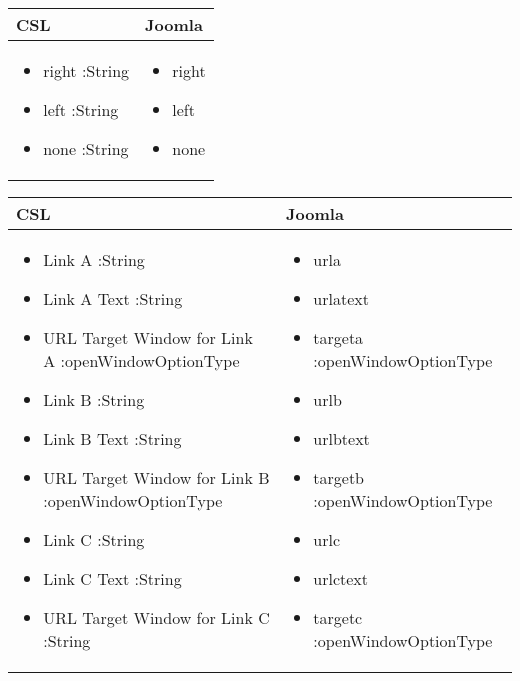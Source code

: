 \begin{minipage}{0.7\textwidth}
\begin{tabular}{|p{} | p{}|}
\hline
\textbf{CSL} & \textbf{Joomla} \\ 
\hline
\begin{itemize}
\item right :String
\item left :String
\item none :String
\end{itemize}
 & 
\begin{itemize}
\item right
\item left
\item none
\end{itemize}
\\
\hline
\end{tabular}
\end{minipage}

\begin{minipage}{0.7\textwidth}
\begin{tabular}{|p{} | p{}|}
\hline
\textbf{CSL} & \textbf{Joomla} \\ 
\hline
\begin{itemize}
\item Link A :String 
\item Link A Text :String 
\item URL Target Window for Link A :openWindowOptionType
\item Link B :String 
\item Link B Text :String 
\item URL Target Window for Link B :openWindowOptionType
\item Link C :String 
\item Link C Text :String 
\item URL Target Window for Link C :String 
\end{itemize}
 & 
\begin{itemize}
\item urla 
\item urlatext 
\item targeta :openWindowOptionType
\item urlb 
\item urlbtext 
\item targetb :openWindowOptionType
\item urlc 
\item urlctext 
\item targetc :openWindowOptionType
\end{itemize}
\\
\hline
\end{tabular}
\end{minipage}

